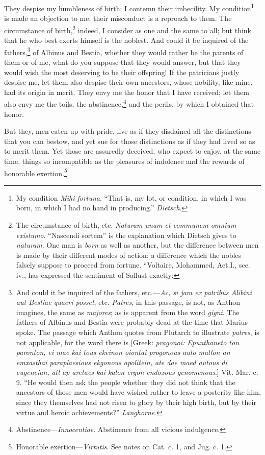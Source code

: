 They despise my humbleness of birth; I contemn their imbecility. My
condition\footnote{My condition \emph{Mihi fortuna}. ``That is, my lot, or condition,
in which I was born, in which I had no hand in producing.'' \emph{Dietsch}.} is made an objection to me; their misconduct is a
reproach to them. The circumstance of birth,\footnote{The circumstance of birth, etc. \emph{Naturam unam et communem
omnium existumo}. ``Nascendi sortem'' is the explanation which Dietsch
gives to \emph{naturam}. One man is \emph{born} as well as another, but the
difference between men is made by their different modes of action; a
difference which the nobles falsely suppose to proceed from fortune.
``Voltaire, Mohammed, Act.I., sce. iv., has expressed the sentiment of
Sallust exactly:} indeed, I consider
as one and the same to all; but think that he who best exerts himself
is the noblest. And could it be inquired of the fathers,\footnote{And could it be inquired of the fathers, etc.—\emph{Ac, si jam
ex patribus Alibini aut Bestiae quaeri posset}, etc. \emph{Patres}, in this
passage, is not, as Anthon imagines, the same as \emph{majores}; as is
apparent from the word \emph{gigni}. The fathers of Albinus and Bestia were
probably dead at the time that Marius spoke. The passage which Anthon
quotes from Plutarch to illustrate \emph{patres}, is not applicable, for
the word there is [Greek: \emph{pragonoi: Epunthaneto ton paronton, ei mae
kai tous ekeinon oiontai progonous auto mallon an emxasthai
paraplaesious ekgonous apolitein, ate dae maed autous di eugeneian,
all ap aretaes kai kalon ergon endoxous genomenous}.] Vit. Mar. c. 9.
``He would then ask the people whether they did not think that the
ancestors of those men would have wished rather to leave a posterity
like him, since they themselves had not risen to glory by their high
birth, but by their virtue and heroic achievements?'' \emph{Langhorne}.} of
Albinus and Bestia, whether they would rather be the parents of them
or of me, what do you suppose that they would answer, but that they
would wish the most deserving to be their offspring! If the patricians
justly despise me, let them also despise their own ancestors, whose
nobility, like mine, had its origin in merit. They envy me the honor
that I have received; let them also envy me the toils, the
abstinence,\footnote{Abstinence—\emph{Innocentiae}. Abstinence from all vicious indulgence.} and the perils, by which I obtained that honor.

But they, men eaten up with pride, live as if they disdained all the
distinctions that you can bestow, and yet sue for those distinctions
as if they had lived so as to merit them. Yet those are assuredly
deceived, who expect to enjoy, at the same time, things so
incompatible as the pleasures of indolence and the rewards of
honorable exertion.\footnote{Honorable exertion—\emph{Virtutis}. See notes on Cat. c. 1, and
Jug. c. 1.}

